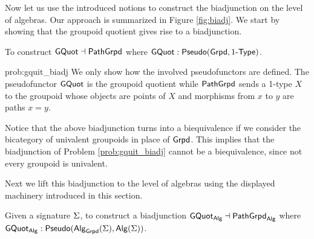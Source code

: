 Now let us use the introduced notions to construct the biadjunction on the level of algebras.
Our approach is summarized in Figure \ref{fig:biadj}.
We start by showing that the groupoid quotient gives rise to a biadjunction.

\begin{problem}
\label{prob:gquit_biadj}
To construct $\mathsf{GQuot} \dashv \mathsf{PathGrpd}$ where $\mathsf{GQuot} : \mathsf{Pseudo}(\mathsf{Grpd}, 1\mbox{-}\mathsf{Type})$.
\end{problem}

\begin{construction}{prob:gquit_biadj}
\label{constr:gquit_biadj}
We only show how the involved pseudofunctors are defined.
The pseudofunctor $\mathsf{GQuot}$ is the groupoid quotient
while $\mathsf{PathGrpd}$ sends a 1-type $X$ to the groupoid whose objects are points of $X$ and morphisms from $x$ to $y$ are paths $x = y$.
\end{construction}
Notice that the above biadjunction turns into a biequivalence if we consider the bicategory of univalent groupoids in place of $\mathsf{Grpd}$. This implies that the biadjunction of Problem \ref{prob:gquit_biadj} cannot be a biequivalence, since not every groupoid is univalent.

Next we lift this biadjunction to the level of algebras using the displayed machinery introduced in this section.

\begin{problem}
\label{prob:alg_biadj}
Given a signature $\Sigma$, to construct a biadjunction $\mathsf{GQuot}_{\mathsf{Alg}} \dashv \mathsf{PathGrpd}_{\mathsf{Alg}}$ where $\mathsf{GQuot}_{\mathsf{Alg}} : \mathsf{Pseudo}(\mathsf{Alg}_{\mathsf{Grpd}}(\Sigma), \mathsf{Alg}(\Sigma))$.
\end{problem}

